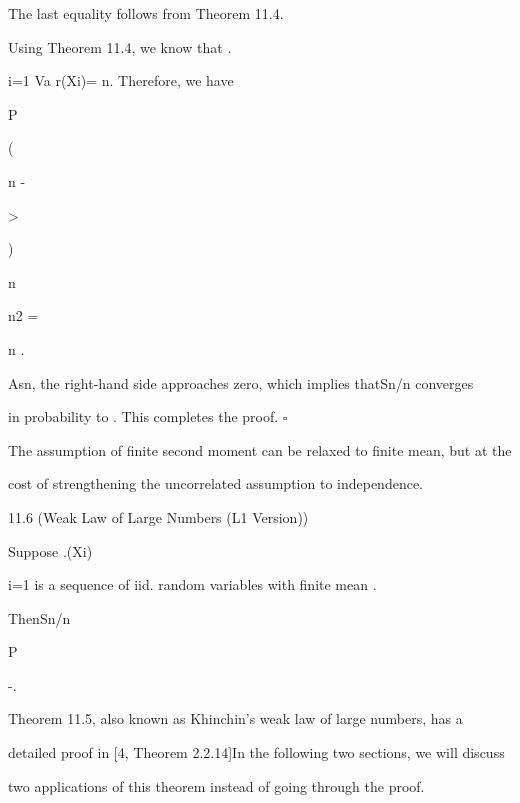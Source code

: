 The last equality follows from Theorem 11.4.

Using Theorem 11.4, we know that .

\sumn

i=1 Va r(Xi)= n. Therefore, we have

P

( \vert\vert\vertSn

n -\mu

\vert\vert\vert >\epsilon

)

\leq n

n2 = 

n .

Asn\to\infty , the right-hand side approaches zero, which implies thatSn/n converges

in probability to \mu. This completes the proof. \hfill $\square$

The assumption of finite second moment can be relaxed to finite mean, but at the

cost of strengthening the uncorrelated assumption to independence.

\begin{thmbox}{11.6 (Weak Law of Large Numbers (L1 Version))}
\end{thmbox}

Suppose .(Xi)\infty

i=1 is a sequence of iid. random variables with finite mean \mu.

ThenSn/n

P

-\to \mu .

Theorem 11.5, also known as Khinchin's weak law of large numbers, has a

detailed proof in [4, Theorem 2.2.14]In the following two sections, we will discuss

two applications of this theorem instead of going through the proof.
